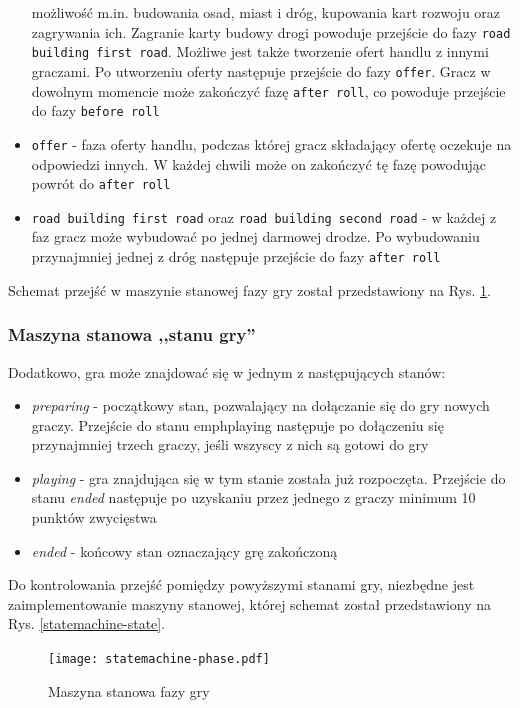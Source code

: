 \documentclass[a4paper,12pt]{article}
\providecommand{\imref}[1]{Rys. \ref{#1}} %
\begin{document}
\begin{itemize}
  możliwość m.in. budowania osad, miast i dróg, kupowania kart rozwoju
  oraz zagrywania ich. Zagranie karty budowy drogi powoduje przejście
  do fazy \texttt{road building first road}. Możliwe jest także
  tworzenie ofert handlu z innymi graczami. Po utworzeniu oferty
  następuje przejście do fazy \texttt{offer}. Gracz w dowolnym
  momencie może zakończyć fazę \texttt{after roll}, co powoduje
  przejście do fazy \texttt{before roll}
\item \texttt{offer} - faza oferty handlu, podczas której gracz
  składający ofertę oczekuje na odpowiedzi innych. W każdej chwili
  może on zakończyć tę fazę powodując powrót do \texttt{after roll}
\item \texttt{road building first road} oraz \texttt{road building second
    road} - w każdej z faz gracz może wybudować po jednej darmowej
  drodze. Po wybudowaniu przynajmniej jednej z dróg następuje
  przejście do fazy \texttt{after roll}
\end{itemize}

Schemat przejść w maszynie stanowej fazy gry został przedstawiony na
\imref{statemachine-phase}.

\subsubsection{Maszyna stanowa ,,stanu gry''}

Dodatkowo, gra może znajdować się w jednym z następujących stanów:

\begin{itemize}
\item \emph{preparing} - początkowy stan, pozwalający na
  dołączanie się do gry nowych graczy. Przejście do stanu
  emph{playing} następuje po dołączeniu się przynajmniej trzech
  graczy, jeśli wszyscy z nich są gotowi do gry
\item \emph{playing} - gra znajdująca się w tym stanie została już
  rozpoczęta. Przejście do stanu \emph{ended} następuje po uzyskaniu
  przez jednego z graczy minimum 10 punktów zwycięstwa
\item \emph{ended} - końcowy stan oznaczający grę zakończoną
\end{itemize}

Do kontrolowania przejść pomiędzy powyższymi stanami gry, niezbędne
jest zaimplementowanie maszyny stanowej, której schemat został
przedstawiony na \imref{statemachine-state}.

\begin{figure}[ht]
  \begin{center}
    \texttt{[image: statemachine-phase.pdf]}
  \end{center}
  \caption{Maszyna stanowa fazy gry}
  \label{statemachine-phase}
\end{figure}
\end{document}
